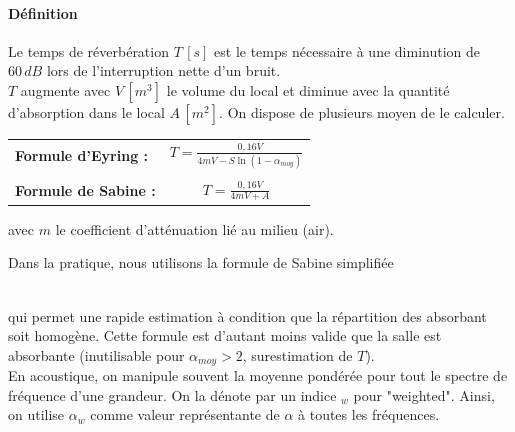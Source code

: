 \documentclass[11pt]{report}
\begin{document}
\paragraph{Définition } Le temps de réverbération $T\,[s]$ est le temps nécessaire à une diminution de $60\,dB$ lors de l'interruption nette d'un bruit.\\

$T$ augmente avec $V\,[m^3]$ le volume du local et diminue avec la quantité d'absorption dans le local $A\,[m^2]$. On dispose de plusieurs moyen de le calculer. 
\begin{center}
\begin{tabular}{lc}
\textbf{Formule d'Eyring :} & $T=\displaystyle\frac{0,16 V}{4 m V- S \ln (1-\alpha_{moy})}$\\
&\\
\textbf{Formule de Sabine :} & $T=\displaystyle\frac{0,16 V}{4mV + A}$\\
\end{tabular}
\end{center}
avec $m$ le coefficient d'atténuation lié au milieu (air).


Dans la pratique, nous utilisons la formule de Sabine simplifiée 

\\

qui permet une rapide estimation à condition que la répartition des absorbant soit homogène. Cette formule est d'autant moins valide que la salle est absorbante (inutilisable pour $\alpha_{moy}>2$, surestimation de $T$).\\

En acoustique, on manipule souvent la moyenne pondérée pour tout le spectre de fréquence d'une grandeur. On la dénote par un indice $_w$ pour "weighted". Ainsi, on utilise $\alpha_w$ comme valeur représentante de $\alpha$ à toutes les fréquences. 
\end{document}
